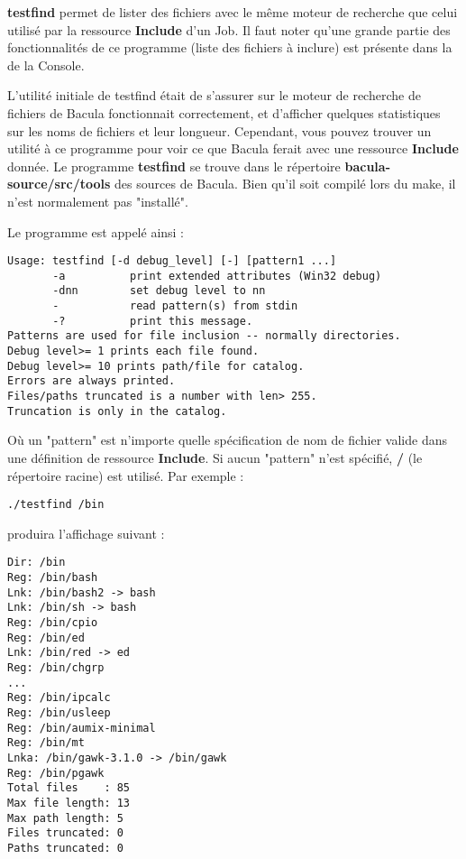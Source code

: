 {\bf testfind} permet de lister des fichiers avec le même moteur de recherche
que celui utilisé par la ressource {\bf Include} d'un Job. Il faut noter qu'une
grande partie des fonctionnalités de ce programme (liste des fichiers à inclure)
est présente dans la  de la Console. 

L'utilité initiale de testfind était de s'assurer sur le moteur de recherche
de fichiers de Bacula fonctionnait correctement, et d'afficher quelques 
statistiques sur les noms de fichiers et leur longueur. Cependant, vous pouvez
trouver un utilité à ce programme pour voir ce que Bacula ferait avec une 
ressource {\bf Include} donnée. Le programme {\bf testfind} se trouve dans le
répertoire {\bf \lt{}bacula-source\gt{}/src/tools} des sources de Bacula. Bien
qu'il soit compilé lors du make, il n'est normalement pas "installé".

Le programme est appelé ainsi :

\footnotesize
\begin{verbatim}
Usage: testfind [-d debug_level] [-] [pattern1 ...]
       -a          print extended attributes (Win32 debug)
       -dnn        set debug level to nn
       -           read pattern(s) from stdin
       -?          print this message.
Patterns are used for file inclusion -- normally directories.
Debug level>= 1 prints each file found.
Debug level>= 10 prints path/file for catalog.
Errors are always printed.
Files/paths truncated is a number with len> 255.
Truncation is only in the catalog.
\end{verbatim}
\normalsize

Où un "pattern" est n'importe quelle spécification de nom de fichier valide dans
une définition de ressource {\bf Include}. Si aucun "pattern" n'est spécifié, 
{\bf /} (le répertoire racine) est utilisé. Par exemple : 

\footnotesize
\begin{verbatim}
./testfind /bin
\end{verbatim}
\normalsize

produira l'affichage suivant : 

\footnotesize
\begin{verbatim}
Dir: /bin
Reg: /bin/bash
Lnk: /bin/bash2 -> bash
Lnk: /bin/sh -> bash
Reg: /bin/cpio
Reg: /bin/ed
Lnk: /bin/red -> ed
Reg: /bin/chgrp
...
Reg: /bin/ipcalc
Reg: /bin/usleep
Reg: /bin/aumix-minimal
Reg: /bin/mt
Lnka: /bin/gawk-3.1.0 -> /bin/gawk
Reg: /bin/pgawk
Total files    : 85
Max file length: 13
Max path length: 5
Files truncated: 0
Paths truncated: 0
\end{verbatim}
\normalsize

